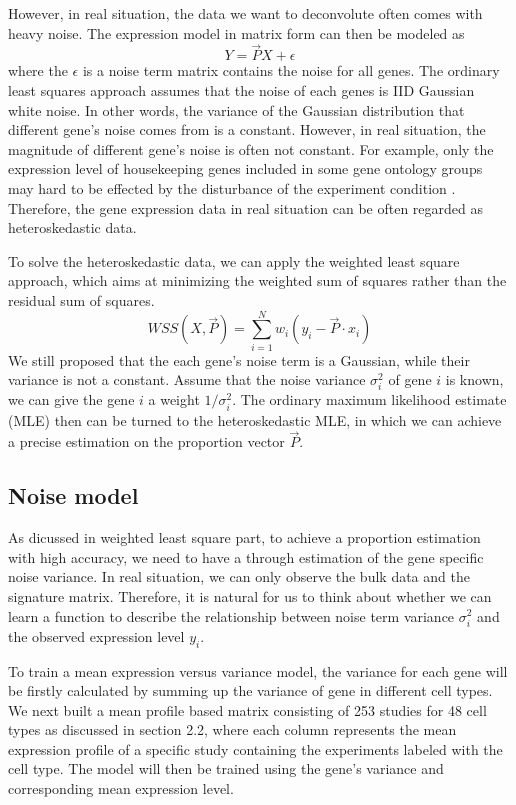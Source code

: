 \documentclass[10pt, a4paper, oneside]{article}
\begin{document}
However, in real situation, the data we want to deconvolute often comes with heavy noise. The expression model in matrix form can then be modeled as
\begin{equation}
    Y = \vec{P}X + \epsilon
\end{equation}
where the $\epsilon$ is a noise term matrix contains the noise for all genes. The ordinary least squares approach assumes that
the noise of each genes is IID Gaussian white noise. In other words, the variance of the Gaussian distribution that different gene's noise
comes from is a constant. However, in real situation, the magnitude of different gene's noise is often not constant. For example, only the expression level of housekeeping genes included in some gene ontology groups
may hard to be effected by the disturbance of the experiment condition \cite{chen2014gene}. Therefore, the gene expression data 
in real situation can be often regarded as heteroskedastic data.

To solve the heteroskedastic data, we can apply the weighted least square approach, which aims at minimizing the weighted sum of squares rather than the residual sum of squares.
\begin{equation}
    WSS(X, \vec{P}) = \sum_{i=1}^N w_i(y_i - \vec{P} \cdot x_i)
\end{equation}
We still proposed that the each gene's noise term is a Gaussian, while their variance is not a constant. Assume that the noise
variance $\sigma_i^2$ of gene $i$ is known, we can give the gene $i$ a weight $1/\sigma_i^2$. The ordinary maximum likelihood estimate (MLE) then
can be turned to the heteroskedastic MLE, in which we can achieve a precise estimation on the proportion vector $\vec{P}$.

\subsection{Noise model}
\justify
As dicussed in weighted least square part, to achieve a proportion estimation with high accuracy, we need to have a through estimation
of the gene specific noise variance. In real situation, we can only observe the bulk data and the signature matrix. Therefore, it is 
natural for us to think about whether we can learn a function to describe the relationship between noise term variance $\sigma_i^2$ and the 
observed expression level $y_i$. 

To train a mean expression versus variance model, 
the variance for each gene will be firstly calculated by summing up the variance of gene in different cell types. 
We next built a mean profile based matrix consisting of 253 studies for 48 cell types as discussed in section 2.2, 
where each column represents the mean expression profile of a specific study containing the experiments labeled with the cell type. 
The model will then be trained using the gene's variance and corresponding mean expression level. 
\end{document}

